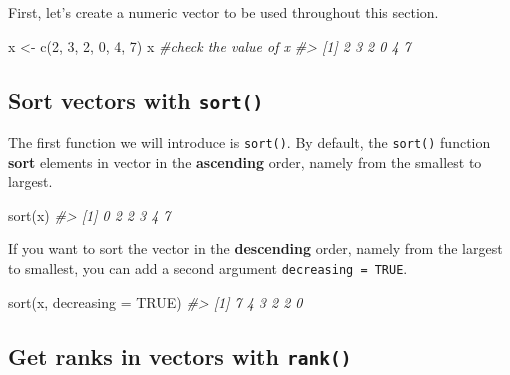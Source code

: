 \documentclass[
]{book}
\newenvironment{Shaded}{\begin{snugshade}}{\end{snugshade}}
\newcommand{\AttributeTok}[1]{\textcolor[rgb]{0.77,0.63,0.00}{#1}}
\newcommand{\CommentTok}[1]{\textcolor[rgb]{0.56,0.35,0.01}{\textit{#1}}}
\newcommand{\ConstantTok}[1]{\textcolor[rgb]{0.00,0.00,0.00}{#1}}
\newcommand{\DecValTok}[1]{\textcolor[rgb]{0.00,0.00,0.81}{#1}}
\newcommand{\FunctionTok}[1]{\textcolor[rgb]{0.00,0.00,0.00}{#1}}
\newcommand{\NormalTok}[1]{#1}
\newcommand{\OtherTok}[1]{\textcolor[rgb]{0.56,0.35,0.01}{#1}}
\begin{document}
First, let's create a numeric vector to be used throughout this section.

\begin{Shaded}
\begin{Highlighting}[]
\NormalTok{x }\OtherTok{\textless{}{-}} \FunctionTok{c}\NormalTok{(}\DecValTok{2}\NormalTok{, }\DecValTok{3}\NormalTok{, }\DecValTok{2}\NormalTok{, }\DecValTok{0}\NormalTok{, }\DecValTok{4}\NormalTok{, }\DecValTok{7}\NormalTok{) }
\NormalTok{x }\CommentTok{\#check the value of x}
\CommentTok{\#\textgreater{} [1] 2 3 2 0 4 7}
\end{Highlighting}
\end{Shaded}

\hypertarget{sort-vectors-with-sort}{%
\subsection{\texorpdfstring{Sort vectors with \texttt{sort()}}{Sort vectors with sort()}}\label{sort-vectors-with-sort}}

The first function we will introduce is \texttt{sort()}. By default, the \texttt{sort()} function \textbf{sort} elements in vector in the \textbf{ascending} order, namely from the smallest to largest.

\begin{Shaded}
\begin{Highlighting}[]
\FunctionTok{sort}\NormalTok{(x)}
\CommentTok{\#\textgreater{} [1] 0 2 2 3 4 7}
\end{Highlighting}
\end{Shaded}

If you want to sort the vector in the \textbf{descending} order, namely from the largest to smallest, you can add a second argument \texttt{decreasing\ =\ TRUE}.

\begin{Shaded}
\begin{Highlighting}[]
\FunctionTok{sort}\NormalTok{(x, }\AttributeTok{decreasing =} \ConstantTok{TRUE}\NormalTok{)}
\CommentTok{\#\textgreater{} [1] 7 4 3 2 2 0}
\end{Highlighting}
\end{Shaded}

\hypertarget{get-ranks-in-vectors-with-rank}{%
\subsection{\texorpdfstring{Get ranks in vectors with \texttt{rank()}}{Get ranks in vectors with rank()}}\label{get-ranks-in-vectors-with-rank}}
\end{document}
